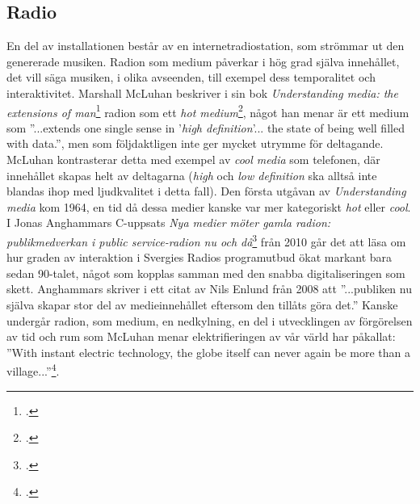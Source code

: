 \documentclass[11pt, a4paper]{article} %
\begin{document}
\subsection*{Radio}
En del av installationen består av en internetradiostation, som strömmar ut den genererade musiken. Radion som medium påverkar i hög grad själva innehållet, det vill säga musiken, i olika avseenden, till exempel dess temporalitet och interaktivitet. 
Marshall McLuhan beskriver i sin bok \emph{Understanding media: the extensions of man}\footcite{mcluhan_understanding_2003} radion som ett \emph{hot medium}\footcite[39]{mcluhan_understanding_2003}, något han menar är ett medium som ''...extends one single sense in '\emph{high definition}'... the state of being well filled with data.'', men som följdaktligen inte ger mycket utrymme för deltagande. McLuhan kontrasterar detta med exempel av \emph{cool media} som telefonen, där innehållet skapas helt av deltagarna (\emph{high} och \emph{low definition} ska alltså inte blandas ihop med ljudkvalitet i detta fall). Den första utgåvan av \emph{Understanding media} kom 1964, en tid då dessa medier kanske var mer kategoriskt \emph{hot} eller \emph{cool}. I Jonas Anghammars C-uppsats \emph{Nya medier möter gamla radion: publikmedverkan i public service-radion nu och då}\footcite{anghammar_nya_2010} från 2010 går det att läsa om hur graden av interaktion i Svergies Radios programutbud ökat markant bara sedan 90-talet, något som kopplas samman med den snabba digitaliseringen som skett. Anghammars skriver i ett citat av Nils Enlund från 2008 att ''...publiken nu själva skapar stor del av medieinnehållet eftersom den tillåts göra det.'' Kanske undergår radion, som medium, en nedkylning, en del i utvecklingen av förgörelsen av tid och rum som McLuhan menar elektrifieringen av vår värld har påkallat: ''With instant electric technology, the globe itself can never again be more than a village...''\footcite[454]{mcluhan_understanding_2003}.


\end{document}
